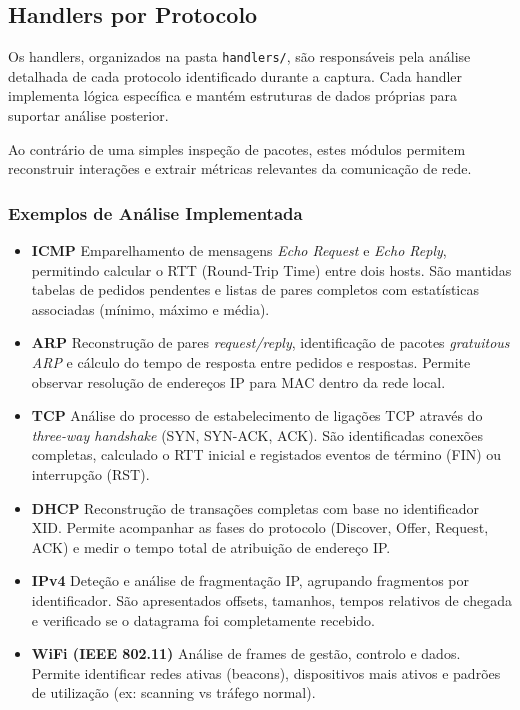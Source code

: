 \documentclass[a4paper,12pt]{article}
\begin{document}
\subsection{Handlers por Protocolo}

Os handlers, organizados na pasta \texttt{handlers/}, são responsáveis pela análise detalhada de cada protocolo identificado durante a captura. Cada handler implementa lógica específica e mantém estruturas de dados próprias para suportar análise posterior.

Ao contrário de uma simples inspeção de pacotes, estes módulos permitem reconstruir interações e extrair métricas relevantes da comunicação de rede.

\subsubsection*{Exemplos de Análise Implementada}

\begin{itemize}

\item \textbf{ICMP}  
Emparelhamento de mensagens \textit{Echo Request} e \textit{Echo Reply}, permitindo calcular o RTT (Round-Trip Time) entre dois hosts.  
São mantidas tabelas de pedidos pendentes e listas de pares completos com estatísticas associadas (mínimo, máximo e média).

\item \textbf{ARP}  
Reconstrução de pares \textit{request/reply}, identificação de pacotes \textit{gratuitous ARP} e cálculo do tempo de resposta entre pedidos e respostas.  
Permite observar resolução de endereços IP para MAC dentro da rede local.

\item \textbf{TCP}  
Análise do processo de estabelecimento de ligações TCP através do \textit{three-way handshake} (SYN, SYN-ACK, ACK).  
São identificadas conexões completas, calculado o RTT inicial e registados eventos de término (FIN) ou interrupção (RST).

\item \textbf{DHCP}  
Reconstrução de transações completas com base no identificador XID.  
Permite acompanhar as fases do protocolo (Discover, Offer, Request, ACK) e medir o tempo total de atribuição de endereço IP.

\item \textbf{IPv4}  
Deteção e análise de fragmentação IP, agrupando fragmentos por identificador.  
São apresentados offsets, tamanhos, tempos relativos de chegada e verificado se o datagrama foi completamente recebido.

\item \textbf{WiFi (IEEE 802.11)}  
Análise de frames de gestão, controlo e dados.  
Permite identificar redes ativas (beacons), dispositivos mais ativos e padrões de utilização (ex: scanning vs tráfego normal).

\end{itemize}
\end{document}
